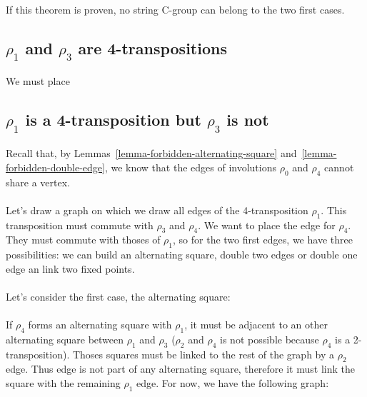 \paragraph{}
If this theorem is proven, no string C-group can belong to the two first cases.

\subsection{$\rho_1$ and $\rho_3$ are 4-transpositions}

\paragraph{}
We must place

\subsection{$\rho_1$ is a 4-transposition but $\rho_3$ is not}

\paragraph{}
Recall that, by Lemmas~\ref{lemma-forbidden-alternating-square} and~\ref{lemma-forbidden-double-edge}, we know that the edges of involutions $\rho_0$ and $\rho_4$ cannot share a vertex.

\paragraph{}
Let's draw a graph on which we draw all edges of the 4-transposition $\rho_1$. This transposition must commute with $\rho_3$ and $\rho_4$. We want to place the edge for $\rho_4$. They must commute with thoses of $\rho_1$, so for the two first edges, we have three possibilities: we can build an alternating square, double two edges or double one edge an link two fixed points.

\paragraph{}
Let's consider the first case, the alternating square:

\paragraph{}
If $\rho_4$ forms an alternating square with $\rho_1$, it must be adjacent to an other alternating square between $\rho_1$ and $\rho_3$ ($\rho_2$ and $\rho_4$ is not possible because $\rho_4$ is a 2-transposition). Thoses squares must be linked to the rest of the graph by a $\rho_2$ edge. Thus edge is not part of any alternating square, therefore it must link the square with the remaining $\rho_1$ edge. For now, we have the following graph:

